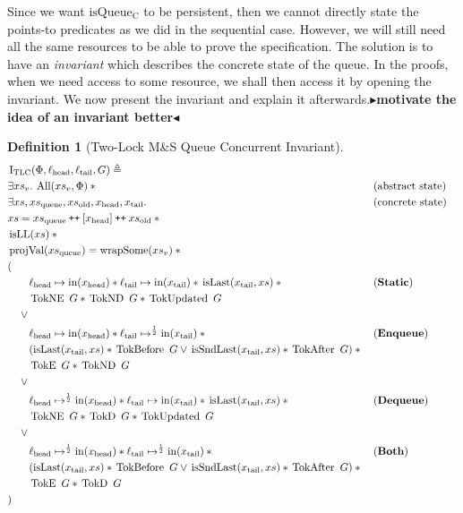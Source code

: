 \documentclass[a4paper, 10pt]{report}
\theoremstyle{definition}
\newtheorem{definition}{Definition}[section]
\newcommand{\msq}{M\&S Queue}
\newcommand{\tlmsq}{Two-Lock \msq{}}
\newcommand{\isqueueconc}{\operatorname{isQueue_{C}}}
\newcommand{\TLQueueInvariantConc}{\operatorname{I_{TLC}}}
\newcommand{\xsc}{xs}
\newcommand{\xsqueue}{xs_{\mathrm{queue}}}
\newcommand{\xsold}{xs_{\mathrm{old}}}
\newcommand{\isLL}{\operatorname{isLL}}
\newcommand{\AllP}{\operatorname{All}}
\newcommand{\projval}{\operatorname{projVal}}
\newcommand{\wrapsome}{\operatorname{wrapSome}}
\newcommand{\isLast}{\operatorname{isLast}}
\newcommand{\isSndLast}{\operatorname{isSndLast}}
\newcommand{\locN}[1]{\loc_{\mathrm{#1}}}
\newcommand{\lochead}{\locN{head}}
\newcommand{\loctail}{\locN{tail}}
\newcommand{\nIn}[1]{\operatorname{in}(#1)}
\newcommand{\node}{x}
\newcommand{\nodeN}[1]{\node_{\mathrm{#1}}}
\newcommand{\nodehead}{\nodeN{head}}
\newcommand{\nodetail}{\nodeN{tail}}
\newcommand{\absvalueList}{xs_v}
\newcommand{\StaticState}{\textbf{Static}\xspace}
\newcommand{\EnqueueState}{\textbf{Enqueue}\xspace}
\newcommand{\DequeueState}{\textbf{Dequeue}\xspace}
\newcommand{\BothState}{\textbf{Both}\xspace}
\newcommand{\Qg}{G}
\newcommand{\TokE}[1]{\operatorname{TokE} ~ #1}
\newcommand{\TokEQg}{\TokE{\Qg}}
\newcommand{\TokNE}[1]{\operatorname{TokNE} ~ #1}
\newcommand{\TokNEQg}{\TokNE{\Qg}}
\newcommand{\TokD}[1]{\operatorname{TokD} ~ #1}
\newcommand{\TokDQg}{\TokD{\Qg}}
\newcommand{\TokND}[1]{\operatorname{TokND} ~ #1}
\newcommand{\TokNDQg}{\TokND{\Qg}}
\newcommand{\TokBefore}[1]{\operatorname{TokBefore} ~ #1}
\newcommand{\TokBeforeQg}{\TokBefore{\Qg}}
\newcommand{\TokAfter}[1]{\operatorname{TokAfter} ~ #1}
\newcommand{\TokAfterQg}{\TokAfter{\Qg}}
\newcommand{\TokUpdated}[1]{\operatorname{TokUpdated} ~ #1}
\newcommand{\TokUpdatedQg}{\TokUpdated{\Qg}}
\newcommand\catenate{\mathbin{\text{\ttfamily\upshape ++}}}
\newcommand{\todo}[1]{{\color[rgb]{.5,0,0}\textbf{$\blacktriangleright$#1$\blacktriangleleft$}}}
\begin{document}
Since we want $\isqueueconc$ to be persistent, then we cannot directly state the points-to predicates as we did in the sequential case. However, we will still need all the same resources to be able to prove the specification. The solution is to have an \textit{invariant} which describes the concrete state of the queue. In the proofs, when we need access to some resource, we shall then access it by opening the invariant. We now present the invariant and explain it afterwards.\todo{motivate the idea of an invariant better}
\begin{definition}[\tlmsq{} Concurrent Invariant]\label{TLMSQ:spec:conc:invariant}
  \begin{align*}
    &\TLQueueInvariantConc(\Phi, \lochead, \loctail, \Qg) \eqdef\\
    &\Exists \absvalueList. \AllP(\absvalueList, \Phi) \star{} &&\text{(abstract state)}\\
    &\Exists \xsc, \xsqueue, \xsold, \nodehead, \nodetail . &&\text{(concrete state)}\\
    &\xsc = \xsqueue \catenate [\nodehead] \catenate \xsold \star{}\\
    &\isLL(\xsc) \star{}\\
    &\projval(\xsqueue) = \wrapsome(\absvalueList) \star{}\\
    &(\\
    &\quad\quad\lochead \mapsto \nIn{\nodehead} \star{} \loctail \mapsto \nIn{\nodetail} \star{} \isLast(\nodetail, \xsc) \star{} &&\text{(\StaticState)}\\
    &\quad\quad \TokNEQg \star{} \TokNDQg \star{} \TokUpdatedQg\\
    &\quad\lor{}\\
    &\quad\quad\lochead \mapsto \nIn{\nodehead} \star{} \loctail \mapsto^{\frac{1}{2}} \nIn{\nodetail} \star{} &&\text{(\EnqueueState)}\\
    &\quad\quad (\isLast(\nodetail, \xsc) \star{} \TokBeforeQg \lor{} \isSndLast(\nodetail, \xsc) \star{} \TokAfterQg) \star{}\\
    &\quad\quad \TokEQg \star{} \TokNDQg\\
    &\quad\lor{}\\
    &\quad\quad\lochead \mapsto^{\frac{1}{2}} \nIn{\nodehead} \star{} \loctail \mapsto \nIn{\nodetail} \star{} \isLast(\nodetail, \xsc) \star{} &&\text{(\DequeueState)}\\
    &\quad\quad \TokNEQg \star{} \TokDQg \star{} \TokUpdatedQg\\
    &\quad\lor{}\\
    &\quad\quad\lochead \mapsto^{\frac{1}{2}} \nIn{\nodehead} \star{} \loctail \mapsto^{\frac{1}{2}} \nIn{\nodetail} \star{} &&\text{(\BothState)}\\
    &\quad\quad (\isLast(\nodetail, \xsc) \star{} \TokBeforeQg \lor{} \isSndLast(\nodetail, \xsc) \star{} \TokAfterQg) \star{} \\
    &\quad\quad \TokEQg \star{} \TokDQg\\
    &)
  \end{align*}
\end{definition}
\end{document}
